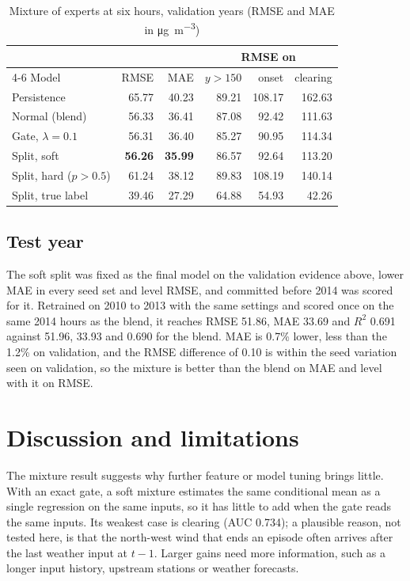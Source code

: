 \documentclass[conference]{IEEEtran}
\newcommand{\ugm}{\si{\micro\gram\per\cubic\metre}}
\begin{document}
\begin{table}[!htb]
\centering
\caption{Mixture of experts at six hours, validation years (RMSE and MAE in \ugm)}
\label{tab:moe}
\setlength{\tabcolsep}{4pt}
\begin{tabular}{@{}lrrrrr@{}}
\toprule
 & & & \multicolumn{3}{c}{RMSE on} \\
\cmidrule(l){4-6}
Model & RMSE & MAE & $y > 150$ & onset & clearing \\
\midrule
Persistence & 65.77 & 40.23 & 89.21 & 108.17 & 162.63 \\
Normal (blend) & 56.33 & 36.41 & 87.08 & 92.42 & 111.63 \\
Gate, $\lambda = 0.1$ & 56.31 & 36.40 & 85.27 & 90.95 & 114.34 \\
Split, soft & \textbf{56.26} & \textbf{35.99} & 86.57 & 92.64 & 113.20 \\
Split, hard ($p > 0.5$) & 61.24 & 38.12 & 89.83 & 108.19 & 140.14 \\
Split, true label & 39.46 & 27.29 & 64.88 & 54.93 & 42.26 \\
\bottomrule
\end{tabular}
\end{table}

\subsection{Test year}
\label{sec:moetest}
The soft split was fixed as the final model on the validation evidence above, lower MAE in every seed set and level RMSE, and committed before 2014 was scored for it. Retrained on 2010 to 2013 with the same settings and scored once on the same 2014 hours as the blend, it reaches RMSE 51.86, MAE 33.69 and $R^2$ 0.691 against 51.96, 33.93 and 0.690 for the blend. MAE is 0.7\% lower, less than the 1.2\% on validation, and the RMSE difference of 0.10 is within the seed variation seen on validation, so the mixture is better than the blend on MAE and level with it on RMSE.

\section{Discussion and limitations}
\label{sec:discussion}
The mixture result suggests why further feature or model tuning brings little. With an exact gate, a soft mixture estimates the same conditional mean as a single regression on the same inputs, so it has little to add when the gate reads the same inputs. Its weakest case is clearing (AUC 0.734); a plausible reason, not tested here, is that the north-west wind that ends an episode often arrives after the last weather input at $t-1$. Larger gains need more information, such as a longer input history, upstream stations or weather forecasts.
\end{document}

